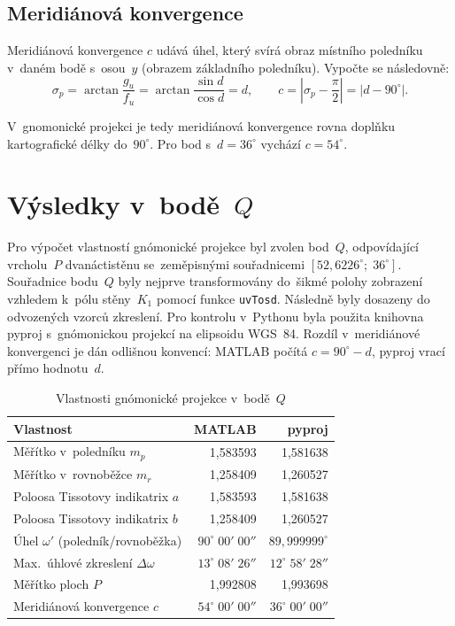 \documentclass[11pt, a4paper]{article}
\begin{document}
\subsection{Meridiánová konvergence}

Meridiánová konvergence $c$ udává úhel, který svírá obraz místního poledníku v~daném bodě s~osou~$y$ (obrazem základního poledníku). Vypočte se následovně:
\begin{equation}
    \sigma_p = \arctan \frac{g_u}{f_u} = \arctan \frac{\sin d}{\cos d} = d, \qquad c = \left|\sigma_p - \frac{\pi}{2}\right| = \left|d - 90^{\circ}\right|.
\end{equation}

V~gnomonické projekci je tedy meridiánová konvergence rovna doplňku 
kartografické délky do~$90^\circ$. Pro bod s~$d = 36^\circ$ vychází $c = 54^\circ$.

\newpage

\section{Výsledky v~bodě~$Q$}

Pro výpočet vlastností gnómonické projekce byl zvolen bod~$Q$, odpovídající vrcholu~$P$ dvanáctistěnu se~zeměpisnými souřadnicemi $[52{,}6226^{\circ}; \; 36^{\circ}]$. Souřadnice bodu~$Q$ byly nejprve transformovány do~šikmé polohy zobrazení vzhledem k~pólu stěny~$K_1$ pomocí funkce \texttt{uvTosd}. Následně byly dosazeny do odvozených vzorců zkreslení. Pro kontrolu v~Pythonu byla použita knihovna pyproj s~gnómonickou projekcí na elipsoidu WGS~84. Rozdíl v~meridiánové konvergenci je dán odlišnou konvencí: MATLAB počítá $c = 90^{\circ} - d$, pyproj vrací přímo hodnotu~$d$.

\begin{table}[h!]
\centering
\caption{Vlastnosti gnómonické projekce v~bodě~$Q$}
\begin{tabularx}{\textwidth}{X r r} %
\toprule
\textbf{Vlastnost} & \textbf{MATLAB} & \textbf{pyproj} \\
\midrule
Měřítko v~poledníku $m_p$ & 1,583593 & 1,581638 \\
Měřítko v~rovnoběžce $m_r$ & 1,258409 & 1,260527 \\
Poloosa Tissotovy indikatrix $a$ & 1,583593 & 1,581638 \\
Poloosa Tissotovy indikatrix $b$ & 1,258409 & 1,260527 \\
Úhel $\omega'$ (poledník/rovnoběžka) & $90^{\circ}\;00'\;00''$ & $89{,}999999^{\circ}$ \\
Max.~úhlové zkreslení $\Delta\omega$ & $13^{\circ}\;08'\;26''$ & $12^{\circ}\;58'\;28''$ \\
Měřítko ploch $P$ & 1,992808 & 1,993698 \\
Meridiánová konvergence $c$ & $54^{\circ}\;00'\;00''$ & $36^{\circ}\;00'\;00''$ \\
\bottomrule
\end{tabularx}
\end{table}
\end{document}
